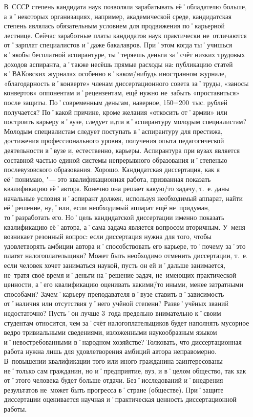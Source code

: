 \begin{drama}
	\maxspeaks В~СССР степень кандидата наук позволяла зарабатывать её˚обладателю больше, а в˚некоторых организациях, например, академической среде, кандидатская степень являлась обязательным условием для продвижения по˚карьерной лестнице. Сейчас заработные платы кандидатов наук практически не~отличаются от˚зарплат специалистов и˚даже бакалавров. При˚этом когда ты˚учишься в˚якобы бесплатной аспирантуре, ты˚теряешь деньги за˚счёт низких трудовых доходов аспиранта, а˚также несёшь прямые расходы на: публикацию статей в˚ВАКовских журналах особенно в˚каком\=/нибудь иностранном журнале,  «благодарность в˚конверте» членам диссертационного совета за˚труды,  «заносы конвертов» оппонентам и˚рецензентам, ещё нужно не~забыть  «проставиться» после защиты. По˚современным деньгам, наверное, 150\==200~тыс. рублей получается? По˚какой причине, кроме желания  «откосить от˚армии» или построить карьеру в˚вузе, следует идти в˚аспирантуру молодым специалистам?
	\michaelspeaks Молодым специалистам следует поступать в˚аспирантуру для престижа, достижения профессионального уровня, получения опыта педагогической деятельности в˚вузе и, естественно, карьеры. Аспирантура при вузах является составной частью единой системы непрерывного образования и˚степенью послевузовского образования.
	\maxspeaks Хорошо. Кандидатская диссертация, как я её˚понимаю, "--- это квалификационная работа, призванная показать квалификацию её˚автора. Конечно она решает какую\=/то задачу, т.~е. даны начальные условия и˚аспирант должен, используя необходимый аппарат, найти её˚решение, ну,˚или, если необходимый аппарат ещё не~придуман, то˚разработать его. Но˚цель кандидатской диссертации именно показать квалификацию её˚автора, а˚сама задача является вопросом вторичным. У~меня возникает резонный вопрос: если диссертация нужна для того, чтобы удовлетворять амбиции автора и˚способствовать его карьере, то˚почему за˚это платят налогоплательщики? Может быть необходимо отменить диссертации, т.~е. если человек хочет заниматься наукой, пусть он ей и˚дальше занимается, не~тратя своё время и˚деньги на˚решение задач, не~имеющих практической ценности, а˚его квалификацию оценивать какими\=/то иными, менее затратными способами? Зачем˚карьеру преподавателя в˚вузе ставить в˚зависимость от˚наличия или отсутствия у˚него учёной степени? Разве˚учёных званий недостаточно? Пусть˚он лучше 3~года предельно внимательно к˚своим студентам относится, чем за˚счёт налогоплательщиков будет наполнять мусорное ведро тривиальными сведениями, изложенными наукообразным языком и˚невостребованными в˚народном хозяйстве?
	\michaelspeaks Толковать, что диссертационная работа нужна лишь для удовлетворения амбиций автора неправомерно. В~повышении квалификации того или иного гражданина заинтересованы не˚только сам гражданин, но и˚предприятие, вуз, и в˚целом общество, так как от˚этого человека будет больше отдачи. Без˚исследований и˚внедрения результатов не~может быть прогресса в˚стране (обществе). При˚защите диссертации оценивается научная и˚практическая ценность диссертационной работы.

\end{drama}
